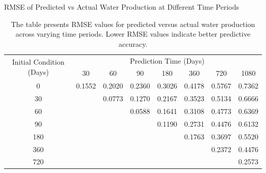 \begin{table}
    \centering
    \caption{RMSE of Predicted vs Actual Water Production at Different Time Periods}
    \label{tab:rmse_water}
    \begin{tabular}{c|ccccccc}
        \toprule
        \multirow{2}{*}{Initial Condition (Days)} & \multicolumn{7}{c}{Prediction Time (Days)} \\
        \cmidrule{2-8}
        & 30 & 60 & 90 & 180 & 360 & 720 & 1080 \\
        \midrule
        0   & 0.1552 & 0.2020 & 0.2360 & 0.3026 & 0.4178 & 0.5767 & 0.7362 \\
        30   &  & 0.0773 & 0.1270 & 0.2167 & 0.3523 & 0.5134 & 0.6666 \\
        60   &  &  & 0.0588 & 0.1641 & 0.3108 & 0.4773 & 0.6369 \\
        90   &  &  &  & 0.1190 & 0.2731 & 0.4476 & 0.6132 \\
        180   &  &  &  &  & 0.1763 & 0.3697 & 0.5520 \\
        360   &  &  &  &  &  & 0.2372 & 0.4476 \\
        720   &  &  &  &  &  &  & 0.2573 \\
        \bottomrule
    \end{tabular}
    \vspace{0.2cm}
    \caption*{The table presents RMSE values for predicted versus actual water production across varying time periods. Lower RMSE values indicate better predictive accuracy.}
\end{table}